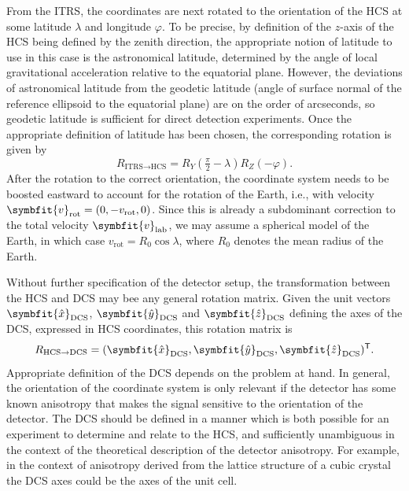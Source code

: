 \documentclass[b5paper, 10pt, twoside]{book}
\renewcommand{\vec}[1]{\symbfit{#1}}
\newcommand{\unitv}[1]{\symbfit{\hat{#1}}}
\newcommand{\transp}{\mathsf{T}}
\begin{document}
From the ITRS, the coordinates are next rotated to the orientation of the HCS at some latitude $\lambda$ and longitude $\varphi$. To be precise, by definition of the $z$-axis of the HCS being defined by the zenith direction, the appropriate notion of latitude to use in this case is the astronomical latitude, determined by the angle of local gravitational acceleration relative to the equatorial plane. However, the deviations of astronomical latitude from the geodetic latitude (angle of surface normal of the reference ellipsoid to the equatorial plane) are on the order of arcseconds, so geodetic latitude is sufficient for direct detection experiments. Once the appropriate definition of latitude has been chosen, the corresponding rotation is given by
\begin{equation}
    R_{\text{ITRS}\rightarrow\text{HCS}}=R_Y(\tfrac{\pi}{2}-\lambda)R_Z(-\varphi).
\end{equation}
After the rotation to the correct orientation, the coordinate system needs to be boosted eastward to account for the rotation of the Earth, i.e., with velocity $\vec{v}_\text{rot}=(0,-v_\text{rot},0)$. Since this is already a subdominant correction to the total velocity $\vec{v}_\text{lab}$, we may assume a spherical model of the Earth, in which case $v_\text{rot}=R_0\cos\lambda$, where $R_0$ denotes the mean radius of the Earth.

Without further specification of the detector setup, the transformation between the HCS and DCS may bee any general rotation matrix. Given the unit vectors $\unitv{x}_\text{DCS}$, $\unitv{y}_\text{DCS}$ and $\unitv{z}_\text{DCS}$ defining the axes of the DCS, expressed in HCS coordinates, this rotation matrix is
\begin{equation}
    R_{\text{HCS}\rightarrow\text{DCS}}=
    (
        \unitv{x}_\text{DCS},
        \unitv{y}_\text{DCS},
        \unitv{z}_\text{DCS}
    )^\transp.
\end{equation}
Appropriate definition of the DCS depends on the problem at hand. In general, the orientation of the coordinate system is only relevant if the detector has some known anisotropy that makes the signal sensitive to the orientation of the detector. The DCS should be defined in a manner which is both possible for an experiment to determine and relate to the HCS, and sufficiently unambiguous in the context of the theoretical description of the detector anisotropy. For example, in the context of anisotropy derived from the lattice structure of a cubic crystal the DCS axes could be the axes of the unit cell.
\end{document}
